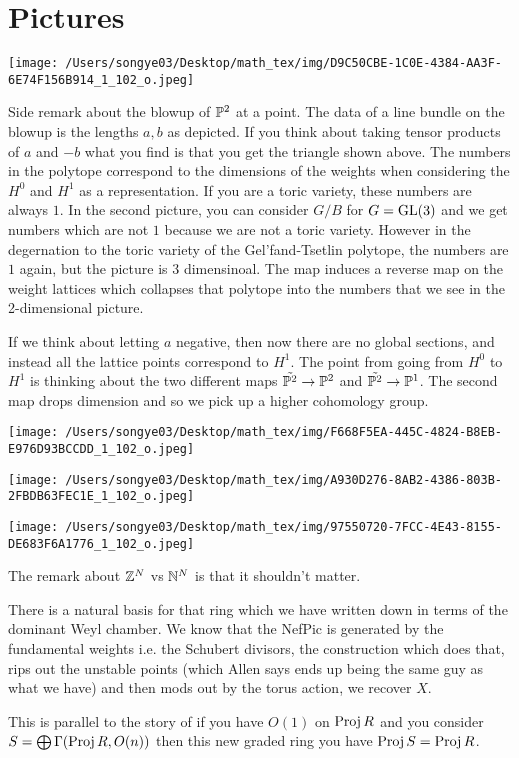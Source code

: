 \documentclass[12pt]{article}
\begin{document}
\section{Pictures}
\begin{center}
    \texttt{[image: /Users/songye03/Desktop/math\_tex/img/D9C50CBE-1C0E-4384-AA3F-6E74F156B914\_1\_102\_o.jpeg]}
\end{center}
Side remark about the blowup of $\P^2$ at a point. The data of a line bundle on the blowup is the lengths $a,b$ as depicted.
If you think about taking tensor products of $a$ and $-b$ what you find is that you get the triangle shown above. The numbers in 
the polytope correspond to the dimensions of the weights when considering the $H^0$ and $H^1$ as a representation. If you are a toric variety, these numbers are 
always $1$. In the second picture, you can consider $G/B$ for $G = \GL(3)$ and we get numbers which are not $1$ because we are not a toric variety. 
However in the degernation to the toric variety of the Gel'fand-Tsetlin polytope, the numbers are $1$ again, but the picture is $3$ dimensinoal. The map induces a reverse map
on the weight lattices which collapses that polytope into the numbers that we see in the 2-dimensional picture.

\hfill

If we think about letting $a$ negative, then now there are no global sections, and instead all the lattice points correspond to $H^1$. The point from going from 
$H^0$ to $H^1$ is thinking about the two different maps $\tilde{\P^2} \to \P^2$ and $\tilde{\P^2} \to \P^1$. The second map drops dimension and 
so we pick up a higher cohomology group.
\begin{center}
    \texttt{[image: /Users/songye03/Desktop/math\_tex/img/F668F5EA-445C-4824-B8EB-E976D93BCCDD\_1\_102\_o.jpeg]}
\end{center}

\begin{center}
    \texttt{[image: /Users/songye03/Desktop/math\_tex/img/A930D276-8AB2-4386-803B-2FBDB63FEC1E\_1\_102\_o.jpeg]}
\end{center}

\begin{center}
    \texttt{[image: /Users/songye03/Desktop/math\_tex/img/97550720-7FCC-4E43-8155-DE683F6A1776\_1\_102\_o.jpeg]}
\end{center}
The remark about $\Z^N$ vs $\N^N$ is that it shouldn't matter.

\hfill 

There is a natural basis for that ring which we have written down in terms of the dominant Weyl chamber. 
We know that the NefPic is generated by the fundamental weights i.e. the Schubert divisors, the construction which does that, rips out the unstable points (which
Allen says ends up being the same guy as what we have) and then mods out by the torus action, we recover $X$.

\hfill

This is parallel to the story of if you have $O(1)$ on $\Proj R$ and you consider $S = \bigoplus \Gamma(\Proj R, O(n))$ then this new graded ring you have 
$\Proj S = \Proj R$. 
\end{document}
